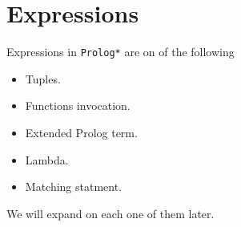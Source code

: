 \section{Expressions}

Expressions in \texttt{Prolog*} are on of the following
\begin{itemize}
    \item Tuples.
    \item Functions invocation.
    \item Extended Prolog term. 
    \item Lambda.
    \item Matching statment.
\end{itemize}

We will expand on each one of them later.
